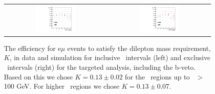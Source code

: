 \begin{figure}[!hb]
\begin{center}
\begin{tabular}{cc}
\includegraphics[width=0.4\textwidth]{plots/extractK_inclusive_bveto_19fb.pdf} &
\includegraphics[width=0.4\textwidth]{plots/extractK_exclusive_bveto_19fb.pdf} \\
\end{tabular}
\caption{
The efficiency for e$\mu$ events to satisfy the dilepton mass requirement, $K$, in data and simulation for inclusive \MET\ intervals (left) and
exclusive \MET\ intervals (right) for the targeted analysis, including the b-veto. 
Based on this we chose $K=0.13\pm0.02$ for the \MET\ regions up to \MET\ $>$ 100 GeV.
For higher \MET\ regions we chose $K=0.13\pm0.07$.
\label{fig:K_targeted}
}

\end{center}
\end{figure}
